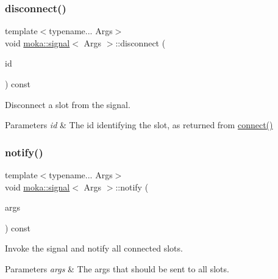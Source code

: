 \subsubsection{\texorpdfstring{disconnect()}{disconnect()}}
{\footnotesize\ttfamily template$<$typename... Args$>$ \\
void \mbox{\hyperlink{classmoka_1_1signal}{moka\+::signal}}$<$ Args $>$\+::disconnect (\begin{DoxyParamCaption}\item[{\mbox{\hyperlink{namespacemoka_a959d3112313fb589684e8b1e3df66385}{slot\+\_\+id}}}]{id }\end{DoxyParamCaption}) const}



Disconnect a slot from the signal. 


\begin{DoxyParams}{Parameters}
{\em id} & The id identifying the slot, as returned from \mbox{\hyperlink{classmoka_1_1signal_a63de4b64ffe3208549cc7497ec2852b6}{connect()}} \\
\hline
\end{DoxyParams}
\mbox{\label{classmoka_1_1signal_a908b81c71f100e074ead0def1f02a9c7}} 
\subsubsection{\texorpdfstring{notify()}{notify()}}
{\footnotesize\ttfamily template$<$typename... Args$>$ \\
void \mbox{\hyperlink{classmoka_1_1signal}{moka\+::signal}}$<$ Args $>$\+::notify (\begin{DoxyParamCaption}\item[{const Args \&...}]{args }\end{DoxyParamCaption}) const}



Invoke the signal and notify all connected slots. 


\begin{DoxyParams}{Parameters}
{\em args} & The args that should be sent to all slots. \\
\hline
\end{DoxyParams}
\mbox{\label{classmoka_1_1signal_a3c01a7532eb7940725ae92413fe2fcc7}} 
